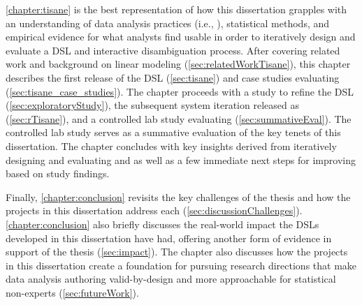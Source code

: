 \autoref{chapter:tisane} is the best representation of how this dissertation
grapples with an understanding of data analysis practices (i.e., \hypoForm),
statistical methods, and empirical evidence for what analysts find usable in
order to iteratively design and evaluate a DSL and interactive disambiguation
process. After covering related work and background on linear modeling
(\autoref{sec:relatedWorkTisane}), this chapter describes the first release of
the \tisane DSL (\autoref{sec:tisane}) and case studies evaluating \tisane
(\autoref{sec:tisane_case_studies}). The chapter proceeds with a study to refine the DSL
(\autoref{sec:exploratoryStudy}), the subsequent system iteration released as
\rTisane (\autoref{sec:rTisane}), and a controlled lab study evaluating \rTisane
(\autoref{sec:summativeEval}). The controlled lab study serves as a summative
evaluation of the key tenets of this dissertation. The chapter concludes with
key insights derived from iteratively designing and evaluating \tisane and
\rTisane as well as a few immediate next steps for improving \rTisane based on
study findings.


Finally, \autoref{chapter:conclusion} revisits the key challenges of the thesis
and how the projects in this dissertation address each
(\autoref{sec:discussionChallenges}). \autoref{chapter:conclusion} also briefly
discusses the real-world impact the DSLs developed in this dissertation have
had, offering another form of evidence in support of the thesis (\autoref{sec:impact}). The chapter
also discusses how the projects in this dissertation create a foundation for
pursuing research directions that make data analysis authoring valid-by-design
and more approachable for statistical non-experts (\autoref{sec:futureWork}). 


\begin{comment}
\todo{Fill in this outline}

\section*{How to approach this dissertation} \todo{Decide if want to keep}

\section{Prior Publication and Authorship} \todo{fill in}
\end{comment}